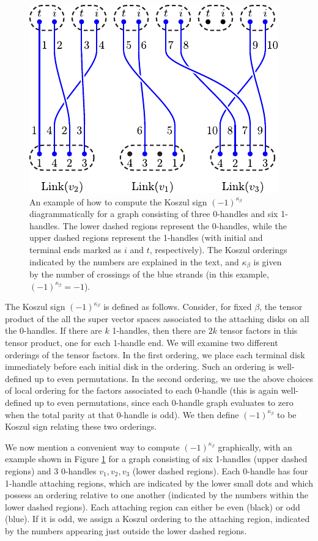\begin{figure} 
\centering
\includegraphics{KoszulFig.pdf} 
\caption{\label{KoszulFig} 
An example of how to compute the Koszul sign $(-1)^{\kappa_\beta}$ diagrammatically  
for a graph consisting of three 0-handles and six 1-handles. 
The lower dashed regions represent the 0-handles, while the upper dashed regions 
represent the 1-handles (with initial and terminal ends marked as $i$ and $t$, respectively). 
The Koszul orderings indicated by the numbers are explained in the text, and 
$\kappa_\beta$ is given by the number of crossings of the blue strands (in this example, 
$(-1)^{\kappa_\beta}=-1$).}
\end{figure}


The Koszul sign $(-1)^{\kappa_\beta}$ is defined as follows.
Consider, for fixed $\beta$, the tensor product of the all the super vector spaces
associated to the attaching disks on all the 0-handles.
If there are $k$ 1-handles, then there are $2k$ tensor factors in this tensor product, one 
for each 1-handle end. 
We will examine two different orderings of the tensor factors.
In the first ordering, we place each terminal disk immediately before each initial disk in the ordering.
Such an ordering is well-defined up to even permutations.
In the second ordering, we use the above choices of local ordering for the factors associated to
each 0-handle
(this is again well-defined up to even permutations, since each 0-handle graph evaluates to zero when the total
parity at that 0-handle is odd).
We then define $(-1)^{\kappa_\beta}$ to be Koszul sign relating these two orderings. 

We now mention a convenient way to compute $(-1)^{\kappa_\beta}$ graphically, with an 
example shown in Figure \ref{KoszulFig} for a graph consisting of six 1-handles (upper dashed regions) and 3 0-handles $v_1,v_2,v_3$ (lower dashed regions). 
Each 0-handle has four 1-handle attaching regions, which are indicated by the lower small dots and 
which possess an ordering relative to one another (indicated by the numbers within the lower dashed regions). Each attaching 
region can either be even (black) or odd (blue). If it is odd, we assign a Koszul ordering to the attaching
region, indicated by the numbers appearing just outside the lower dashed regions.

